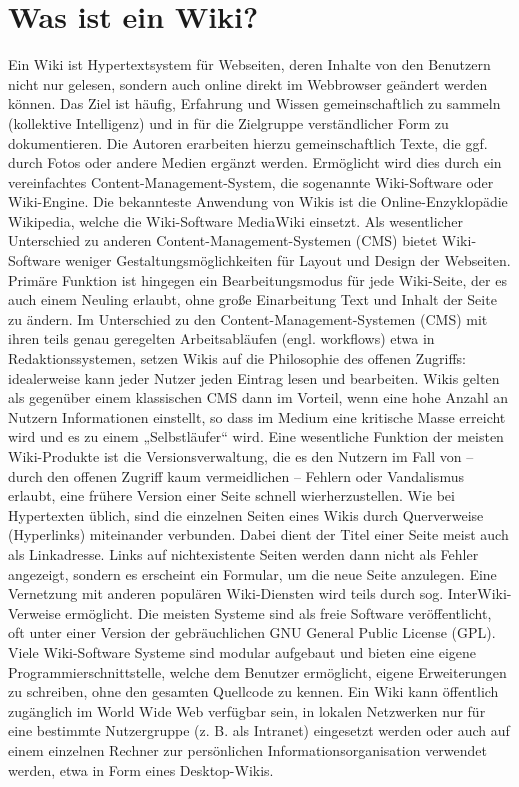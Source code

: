 \documentclass[12pt]{report}
\begin{document}
\section{Was ist ein Wiki?}
Ein Wiki ist Hypertextsystem für Webseiten, deren Inhalte von den Benutzern nicht nur gelesen, sondern auch online direkt im Webbrowser geändert werden können. Das Ziel ist häufig, Erfahrung und Wissen gemeinschaftlich zu sammeln (kollektive Intelligenz) und in für die Zielgruppe verständlicher Form zu dokumentieren. Die Autoren erarbeiten hierzu gemeinschaftlich Texte, die ggf. durch Fotos oder andere Medien ergänzt werden. Ermöglicht wird dies durch ein vereinfachtes Content-Management-System, die sogenannte Wiki-Software oder Wiki-Engine. Die bekannteste Anwendung von Wikis ist die Online-Enzyklopädie Wikipedia, welche die Wiki-Software MediaWiki einsetzt. Als wesentlicher Unterschied zu anderen Content-Management-Systemen (CMS) bietet Wiki-Software weniger Gestaltungsmöglichkeiten für Layout und Design der Webseiten. Primäre Funktion ist hingegen ein Bearbeitungsmodus für jede Wiki-Seite, der es auch einem Neuling erlaubt, ohne große Einarbeitung Text und Inhalt der Seite zu ändern. Im Unterschied zu den Content-Management-Systemen (CMS) mit ihren teils genau geregelten Arbeitsabläufen (engl. workflows) etwa in Redaktionssystemen, setzen Wikis auf die Philosophie des offenen Zugriffs: idealerweise kann jeder Nutzer jeden Eintrag lesen und bearbeiten. Wikis gelten als gegenüber einem klassischen CMS dann im Vorteil, wenn eine hohe Anzahl an Nutzern Informationen einstellt, so dass im Medium eine kritische Masse erreicht wird und es zu einem „Selbstläufer“ wird. Eine wesentliche Funktion der meisten Wiki-Produkte ist die Versionsverwaltung, die es den Nutzern im Fall von – durch den offenen Zugriff kaum vermeidlichen – Fehlern oder Vandalismus erlaubt, eine frühere Version einer Seite schnell wierherzustellen. Wie bei Hypertexten üblich, sind die einzelnen Seiten eines Wikis durch Querverweise (Hyperlinks) miteinander verbunden. Dabei dient der Titel einer Seite meist auch als Linkadresse. Links auf nichtexistente Seiten werden dann nicht als Fehler angezeigt, sondern es erscheint ein Formular, um die neue Seite anzulegen. Eine Vernetzung mit anderen populären Wiki-Diensten wird teils durch sog. InterWiki-Verweise ermöglicht. Die meisten Systeme sind als freie Software veröffentlicht, oft unter einer Version der gebräuchlichen GNU General Public License (GPL). Viele Wiki-Software Systeme sind modular aufgebaut und bieten eine eigene Programmierschnittstelle, welche dem Benutzer ermöglicht, eigene Erweiterungen zu schreiben, ohne den gesamten Quellcode zu kennen. Ein Wiki kann öffentlich zugänglich im World Wide Web verfügbar sein, in lokalen Netzwerken nur für eine bestimmte Nutzergruppe (z. B. als Intranet) eingesetzt werden oder auch auf einem einzelnen Rechner zur persönlichen Informationsorganisation verwendet werden, etwa in Form eines Desktop-Wikis. 
\end{document}
